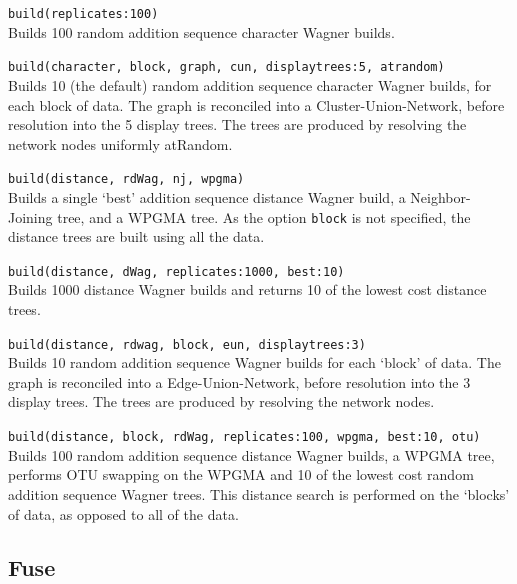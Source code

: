 	\begin{example}
	
		\item{\texttt{build(replicates:100)} \\
		Builds 100 random addition sequence character Wagner builds.}
		
		\item{\texttt{build(character, block, graph, cun, displaytrees:5, atrandom)}\\
		Builds 10 (the default) random addition sequence character Wagner builds, for each 
		block of data. The graph is reconciled into a Cluster-Union-Network, before resolution 
		into the 5 display trees. The trees are produced by resolving the network nodes 
		uniformly atRandom.}
		
		\item{\texttt{build(distance, rdWag, nj, wpgma)} \\ 
		Builds a single `best' addition sequence distance Wagner build, a Neighbor-Joining tree, 
		and a WPGMA tree. As the option \texttt{block} is not specified, the distance trees are 
		built using all the data.}
		
		\item{\texttt{build(distance, dWag, replicates:1000, best:10)}\\
		Builds 1000 distance Wagner builds and returns 10 of the lowest cost distance trees.}
	
		\item{\texttt{build(distance, rdwag, block, eun, displaytrees:3)}\\
		Builds 10 random addition sequence Wagner builds for each `block' of data. The graph 
		is reconciled into a Edge-Union-Network, before resolution into the 3 display trees. 
		The trees are produced by resolving the network nodes.}
		
		\item{\texttt{build(distance, block, rdWag, replicates:100, wpgma, best:10, otu)}\\
		Builds 100 random addition sequence distance Wagner builds, a WPGMA tree, 
		performs OTU swapping on the WPGMA and 10 of the lowest cost random addition 
		sequence Wagner trees. This distance search is performed on the `blocks' of data, 
		as opposed to all of the data.}

	\end{example}

\subsection{Fuse}
